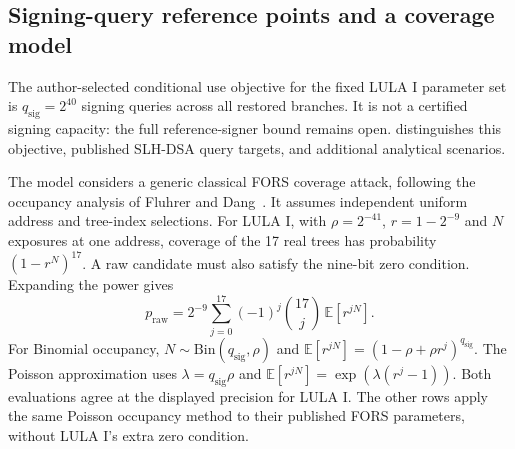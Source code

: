 \subsection{Signing-query reference points and a coverage model}\label{sec:operating}
The author-selected conditional use objective for the fixed LULA I parameter set is $q_{\mathrm{sig}}=2^{40}$ signing queries across all restored branches. It is not a certified signing capacity: the full reference-signer bound remains open.  distinguishes this objective, published SLH-DSA query targets, and additional analytical scenarios.

The model considers a generic classical FORS coverage attack, following the occupancy analysis of Fluhrer and Dang~\cite[Section~5, Equation~(1)]{fluhrer}. It assumes independent uniform address and tree-index selections. For LULA I, with $\rho=2^{-41}$, $r=1-2^{-9}$ and $N$ exposures at one address, coverage of the 17 real trees has probability $(1-r^N)^{17}$. A raw candidate must also satisfy the nine-bit zero condition. Expanding the power gives
\[
 p_{\mathrm{raw}}=2^{-9}\sum_{j=0}^{17}(-1)^j\binom{17}{j}\,\mathbb E[r^{jN}].
\]
For Binomial occupancy, $N\sim\mathrm{Bin}(q_{\mathrm{sig}},\rho)$ and $\mathbb E[r^{jN}]=(1-\rho+\rho r^j)^{q_{\mathrm{sig}}}$. The Poisson approximation uses $\lambda=q_{\mathrm{sig}}\rho$ and $\mathbb E[r^{jN}]=\exp(\lambda(r^j-1))$. Both evaluations agree at the displayed precision for LULA I. The other rows apply the same Poisson occupancy method to their published FORS parameters, without LULA I's extra zero condition.

